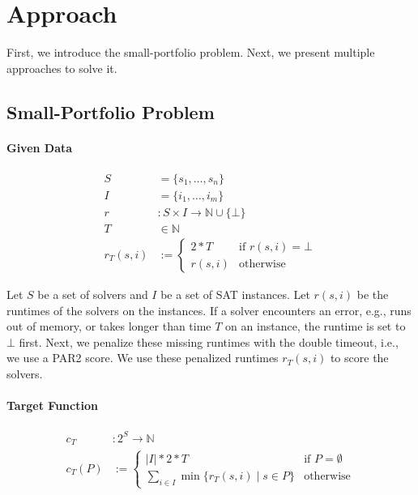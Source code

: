 \section{Approach}
\label{sec:approach}

First, we introduce the small-portfolio problem.
Next, we present multiple approaches to solve it.

\subsection{Small-Portfolio Problem}

\paragraph{Given Data}

\begin{align*}
	S &= \{s_1, \dots, s_n\} \tag*{Solvers}\\
	I &= \{i_1, \dots, i_m\} \tag*{Instances}\\
	r &: S \times I \rightarrow \mathbb{N} \cup \{\bot\} \tag*{Runtimes (censored)}\\
	T &\in \mathbb{N} \tag*{Timeout}\\
	r_T(s,i) &:= \begin{cases}
		2*T & \text{if }r(s,i) = \bot\\
		r(s,i) & \text{otherwise}
	\end{cases} \tag*{Penalized Runtimes}
\end{align*}

Let $S$ be a set of solvers and $I$ be a set of SAT instances.
Let $r(s,i)$ be the runtimes of the solvers on the instances.
If a solver encounters an error, e.g., runs out of memory, or takes longer than time $T$ on an instance, the runtime is set to $\bot$ first.
Next, we penalize these missing runtimes with the double timeout, i.e., we use a PAR2 score.
We use these penalized runtimes $r_T(s,i)$ to score the solvers.

\paragraph{Target Function}

\begin{align*}
	c_{T} &: 2^S \rightarrow \mathbb{N}\\
	c_{T}(P) &:= \begin{cases}
		|I|*2*T & \text{if }P=\emptyset\\
		\sum_{i \in I}{\min\{r_T(s,i) \mid s \in P\}} & \text{otherwise}
	\end{cases} \tag*{Portfolio Cost}
\end{align*}

